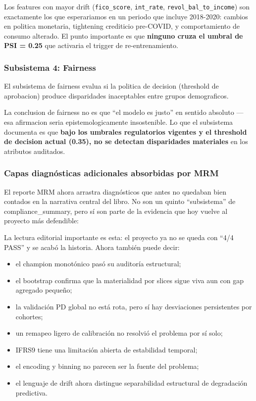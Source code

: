 \documentclass[
  spanish,
  11pt,
  letterpaper,
]{scrbook}
\providecommand{\tightlist}{%
  \setlength{\itemsep}{0pt}\setlength{\parskip}{0pt}}
\theoremstyle{plain}
\theoremstyle{remark}
\begin{document}
Los features con mayor drift (\texttt{fico\_score}, \texttt{int\_rate},
\texttt{revol\_bal\_to\_income}) son exactamente los que esperariamos en
un periodo que incluye 2018-2020: cambios en politica monetaria,
tightening crediticio pre-COVID, y comportamiento de consumo alterado.
El punto importante es que \textbf{ninguno cruza el umbral de PSI =
0.25} que activaria el trigger de re-entrenamiento.

\subsubsection{Subsistema 4: Fairness}\label{sec-mrm-fairness-subsystem}

El subsistema de fairness evalua si la politica de decision (threshold
de aprobacion) produce disparidades inaceptables entre grupos
demograficos.

La conclusion de fairness no es que ``el modelo es justo'' en sentido
absoluto --- esa afirmacion seria epistemologicamente insostenible. Lo
que el subsistema documenta es que \textbf{bajo los umbrales
regulatorios vigentes y el threshold de decision actual (0.35), no se
detectan disparidades materiales} en los atributos auditados.

\subsubsection{Capas diagnósticas adicionales absorbidas por
MRM}\label{capas-diagnuxf3sticas-adicionales-absorbidas-por-mrm}

El reporte MRM ahora arrastra diagnósticos que antes no quedaban bien
contados en la narrativa central del libro. No son un quinto
``subsistema'' de compliance\_summary, pero sí son parte de la evidencia
que hoy vuelve al proyecto más defendible:

La lectura editorial importante es esta: el proyecto ya no se queda con
``4/4 PASS'' y se acabó la historia. Ahora también puede decir:

\begin{itemize}
\tightlist
\item
  el champion monotónico pasó su auditoría estructural;
\item
  el bootstrap confirma que la materialidad por slices sigue viva aun
  con gap agregado pequeño;
\item
  la validación PD global no está rota, pero sí hay desviaciones
  persistentes por cohortes;
\item
  un remapeo ligero de calibración no resolvió el problema por sí solo;
\item
  IFRS9 tiene una limitación abierta de estabilidad temporal;
\item
  el encoding y binning no parecen ser la fuente del problema;
\item
  el lenguaje de drift ahora distingue separabilidad estructural de
  degradación predictiva.
\end{itemize}
\end{document}
